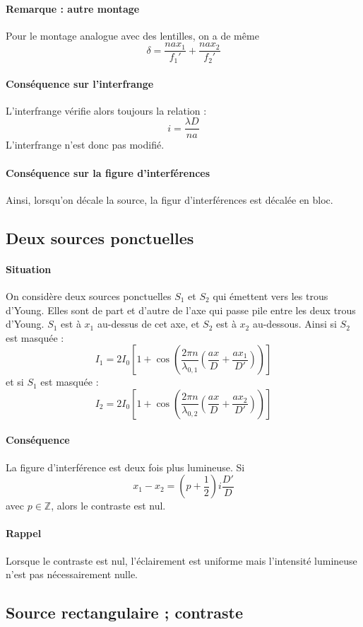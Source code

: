 \documentclass[french]{book}
\theoremstyle{plain}
\theoremstyle{definition}
\theoremstyle{remark}
\newcommand{\Z}{\mathbb{Z}}
\begin{document}
\paragraph{Remarque : autre montage} Pour le montage analogue avec des lentilles, on a de même $$\delta=\frac{nax_1}{f_1'}+\frac{nax_2}{f_2'}$$
\paragraph{Conséquence sur l'interfrange} L'interfrange vérifie alors toujours la relation : $$i=\frac{\lambda D}{na}$$ L'interfrange n'est donc pas modifié.
\paragraph{Conséquence sur la figure d'interférences} Ainsi, lorsqu'on décale la source, la figur d'interférences est décalée en bloc.
\subsection{Deux sources ponctuelles}
\paragraph{Situation} On considère deux sources ponctuelles $S_1$ et $S_2$ qui émettent vers les trous d'Young. Elles sont de part et d'autre de l'axe qui passe pile entre les deux trous d'Young. $S_1$ est à $x_1$ au-dessus de cet axe, et $S_2$ est à $x_2$ au-dessous. Ainsi si $S_2$ est masquée : $$\displaystyle I_1=2I_0\left[1+\cos\left(\frac{2\pi n}{\lambda_{0,1}}\left(\frac{ax}{D}+\frac{ax_1}{D'}\right)\right)\right]$$
et si $S_1$ est masquée : $$I_2=2I_0\left[1+\cos\left(\frac{2\pi n}{\lambda_{0,2}} \left(\frac{ax}{D}+\frac{ax_2}{D'}\right)\right)\right]$$
\paragraph{Conséquence} La figure d'interférence est deux fois plus lumineuse. Si $$x_1-x_2=\left(p+\frac12\right)i\frac{D'}{D}$$ avec $p\in\Z$, alors le contraste est nul.
\paragraph{Rappel} Lorsque le contraste est nul, l'éclairement est uniforme mais l'intensité lumineuse n'est pas nécessairement nulle.

\subsection{Source rectangulaire ; contraste}
\end{document}
